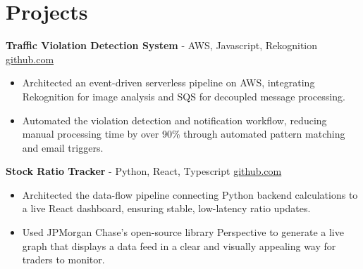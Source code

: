 \documentclass[11pt]{article}       %
\begin{document}

\vspace{-18.5pt}

\section*{Projects}

\textbf{Traffic Violation Detection System}{ - AWS, Javascript, Rekognition} \hfill \href{https://github.com/Monica20030707/AWS_rekonigition-N-read-database}{github.com} \\
\vspace{-9pt}
\begin{itemize}
  \item Architected an event-driven serverless pipeline on AWS, integrating Rekognition for image analysis and SQS for decoupled message processing.
  \item Automated the violation detection and notification workflow, reducing manual processing time by over 90\% through automated pattern matching and email triggers.
\end{itemize}

\textbf{Stock Ratio Tracker}{ - Python, React, Typescript} \hfill \href{https://github.com/Monica20030707/tradingDashboard-UI}{github.com} \\
\vspace{-9pt}
\begin{itemize}
  \item Architected the data-flow pipeline connecting Python backend calculations to a live React dashboard, ensuring stable, low-latency ratio updates. 
  \item Used JPMorgan Chase’s open-source library Perspective to generate a live graph that displays a data feed in a clear and visually appealing way for traders to monitor.
\end{itemize}
\end{document}
